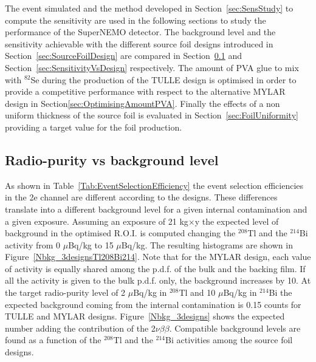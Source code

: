 \documentclass[main.tex]{subfiles}
\begin{document}
\NI The event simulated and the method developed in Section~\ref{sec:SensStudy} to compute the sensitivity are used in the following sections to study the performance of the SuperNEMO detector. The background level and the sensitivity achievable with the different source foil designs introduced in Section~\ref{sec:SourceFoilDesign} are compared in Section~\ref{sec:RadiopurityVsBkg} and Section~\ref{sec:SensitivityVsDesign} respectively. The amount of PVA glue to mix with $^{\text{82}}$Se during the production of the TULLE design is optimised in order to provide a competitive performance with respect to the alternative MYLAR design in Section\ref{sec:OptimisingAmountPVA}. Finally the effects of a non uniform thickness of the source foil is evaluated in Section~\ref{sec:FoilUniformity} providing a target value for the foil production.



\subsection{Radio-purity vs background level}\label{sec:RadiopurityVsBkg}


\NI As shown in Table~\ref{Tab:EventSelectionEfficiency} the event selection efficiencies in the 2e channel are different according to the designs. These differences translate into a different background level for a given internal contamination and a given exposure. Assuming an exposure of 21 kg$\times$y the expected level of background in the optimised R.O.I. is computed changing the $^{\text{208}}$Tl and the $^{\text{214}}$Bi activity from 0 $\mu$Bq/kg to 15 $\mu$Bq/kg. The resulting histograms are shown in Figure~\ref{Nbkg_3designsTl208Bi214}. Note that for the MYLAR design, each value of activity is equally shared among the p.d.f. of the bulk and the backing film. If all the activity is given to the bulk p.d.f. only, the background increases by 10. At the target radio-purity level of 2 $\mu$Bq/kg in $^{\text{208}}$Tl and 10 $\mu$Bq/kg in $^{\text{214}}$Bi the expected background coming from the internal contamination is 0.15 counts for TULLE and MYLAR designs. Figure~\ref{Nbkg_3designs} shows the expected number adding the contribution of the 2$\nu\beta\beta$. Compatible background levels are found as a function of the $^{\text{208}}$Tl and the $^{\text{214}}$Bi activities among the source foil designs.
\end{document}
